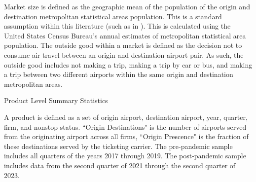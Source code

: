 \documentclass{article}
\begin{document}
	Market size is defined as the geographic mean of the population of the origin and destination metropolitan statistical areas population. This is a standard assumption within this literature (such as in \citep{ciliberto_market_2021}). This is calculated using the United States Census Bureau's annual estimates of metropolitan statistical area population. The outside good within a market is defined as the decision not to consume air travel between an origin and destination airport pair. As such, the outside good includes not making a trip, making a trip by car or bus, and making a trip between two different airports within the same origin and destination metropolitan areas. 
    

    \begin{table}
    \caption{Product Level Summary Statistics}
    \label{tab:Summary_Statistics_Product}
                    \vspace{-15mm}
                    \begin{center}
    
    \footnotesize{A product is defined as a set of origin airport, destination airport, year, quarter, firm, and nonstop status. ``Origin Destinations" is the number of airports served from the originating airport across all firms, ``Origin Prescence" is the fraction of these destinations served by the ticketing carrier. The pre-pandemic sample includes all quarters of the years 2017 through 2019. The post-pandemic sample includes data from the second quarter of 2021 through the second quarter of 2023.}
                    \end{center}
    \end{table}
\end{document}
